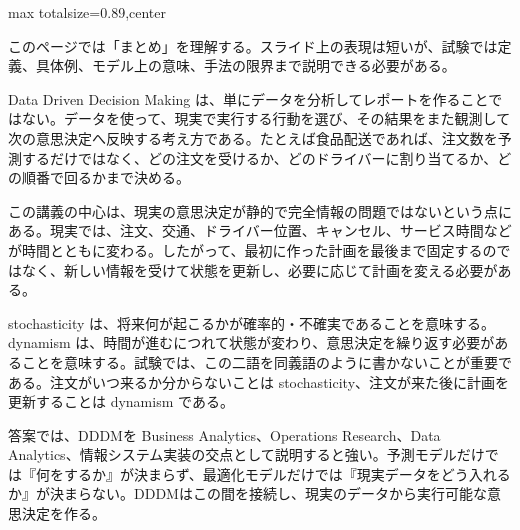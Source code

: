 \begin{minipage}[t]{0.58\textwidth}
\begin{adjustbox}{max totalsize={\textwidth}{0.89\textheight},center}
\begin{minipage}{\textwidth}\scriptsize
{}このページでは「まとめ」を理解する。スライド上の表現は短いが、試験では定義、具体例、モデル上の意味、手法の限界まで説明できる必要がある。\par
Data Driven Decision Making は、単にデータを分析してレポートを作ることではない。データを使って、現実で実行する行動を選び、その結果をまた観測して次の意思決定へ反映する考え方である。たとえば食品配送であれば、注文数を予測するだけではなく、どの注文を受けるか、どのドライバーに割り当てるか、どの順番で回るかまで決める。\par
この講義の中心は、現実の意思決定が静的で完全情報の問題ではないという点にある。現実では、注文、交通、ドライバー位置、キャンセル、サービス時間などが時間とともに変わる。したがって、最初に作った計画を最後まで固定するのではなく、新しい情報を受けて状態を更新し、必要に応じて計画を変える必要がある。\par
stochasticity は、将来何が起こるかが確率的・不確実であることを意味する。dynamism は、時間が進むにつれて状態が変わり、意思決定を繰り返す必要があることを意味する。試験では、この二語を同義語のように書かないことが重要である。注文がいつ来るか分からないことは stochasticity、注文が来た後に計画を更新することは dynamism である。\par
答案では、DDDMを Business Analytics、Operations Research、Data Analytics、情報システム実装の交点として説明すると強い。予測モデルだけでは『何をするか』が決まらず、最適化モデルだけでは『現実データをどう入れるか』が決まらない。DDDMはこの間を接続し、現実のデータから実行可能な意思決定を作る。\par

\end{minipage}
\end{adjustbox}
\end{minipage}
